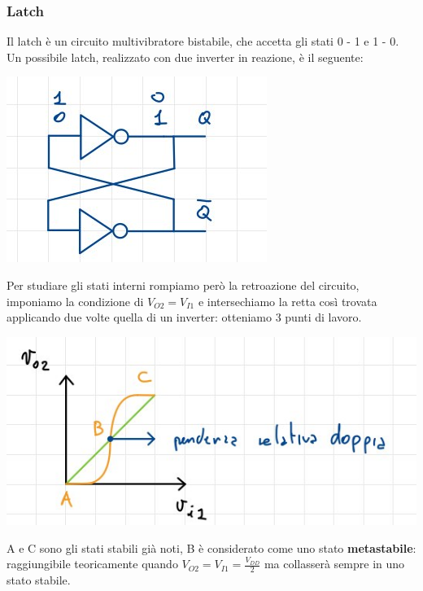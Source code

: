 \documentclass[11pt,a4paper,]{article}
\begin{document}
\subsubsection{Latch}
Il latch è un circuito multivibratore bistabile, che accetta gli stati 0 - 1 e 1 - 0. Un possibile latch, realizzato con due inverter in reazione, è il seguente:
\begin{center}
	\includegraphics[width=0.3\linewidth]{"img/latch 2 inv"}
\end{center}
Per studiare gli stati interni rompiamo però la retroazione del circuito, imponiamo la condizione di $V_{O2} = V_{I1}$ e intersechiamo la retta così trovata applicando due volte quella di un inverter: otteniamo 3 punti di lavoro.
\begin{center}
	\includegraphics[width=0.3\linewidth]{"img/latch 2 inv1"}
\end{center}
A e C sono gli stati stabili già noti, B è considerato come uno stato \textbf{metastabile}: raggiungibile teoricamente quando $V_{O2} = V_{I1}=\frac{V_{DD}}{2}$ ma collasserà sempre in uno stato stabile. 


 
\end{document}
